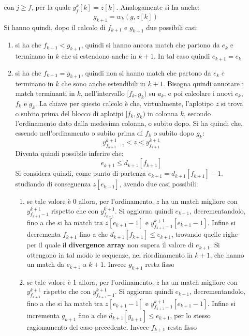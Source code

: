 con $j\geq f$, per la quale $y_j^k[k]=z[k]$. Analogamente si ha anche:
\[g_{k+1}=w_k(g,z[k])\]
Si hanno quindi, dopo il calcolo di $f_{k+1}$ e $g_{k+1}$ due possibili casi:
\begin{enumerate}
  \item si ha che $f_{k+1}<g_{k+1}$, quindi si hanno ancora match che partono da
  $e_k$ e terminano in $k$ che si estendono anche in $k+1$. In tal caso quindi
  $e_{k+1}=e_k$
  \item si ha che $f_{k+1}=g_{k+1}$, quindi non si hanno match che partono da
  $e_k$ e terminano in $k$ che sono anche estendibili in $k+1$. Bisogna quindi
  annotare i match terminanti in $k$, nell'intervallo $[f_k,g_k)$ su $a_k$,
  e poi calcolare i nuovi $e_k$, $f_k$ e $g_k$. La chiave per questo calcolo è
  che, virtualmente, l'aplotipo $z$ si trova o  subito prima del blocco di
  aplotipi $[f_k,g_k)$ in colonna $k$, secondo l'ordinamento dato dalla medesima
  colonna, o subito dopo. Si ha quindi che, essendo nell'ordinamento o subito
  prima di $f_{k}$ o subito dopo $g_k$:
  \[y_{f_{k+1}-1}^{k+1}<z<y_{f_{k+1}}^{k+1}\]
  Diventa quindi possibile inferire che:
  \[e_{k+1}\leq d_{k+1}[f_{k+1}]\]
  Si considera quindi, come punto di partenza $e_{k+1}=d_{k+1}[f_{k+1}]-1$,
  studiando di conseguenza $z[e_{k+1}]$, avendo due casi possibili:
  \begin{enumerate}
    \item se tale valore è 0 allora, per l'ordinamento, $z$ ha un match migliore
    con $y_{f_{k+1}-1}^{k+1}$ rispetto che con $y_{f_{k+1}}^{k+1}$. Si aggiorna
    quindi $e_{k+1}$, decrementandolo, fino a che si ha match tra $z[e_{k+1}-1]$
    e $y_{f_{k+1}-1}^{k+1}[e_{k+1}-1]$. Infine si decrementa $f_{k+1}$ fino a
    che $d_{k+1}[f_{k+1}]\leq e_{k+1}$, trovando quelle righe per il quale il
    \textbf{divergence array} non supera il valore di $e_{k+1}$. Si ottengono in
    tal modo le sequenze, nel riordinamento in $k+1$, che hanno un match da
    $e_{k+1}$ a $k+1$. Invece $g_{k+1}$ resta fisso
    \item se tale valore è 1 allora, per l'ordinamento, $z$ ha un match migliore
    con $y_{f_{k+1}}^{k+1}$ rispetto che con $y_{f_{k+1}-1}^{k+1}$. Si aggiorna
    quindi $e_{k+1}$, decrementandolo, fino a che si ha match tra $z[e_{k+1}-1]$
    e $y_{f_{k+1}-1}^{k+1}[e_{k+1}-1]$. Infine si incrementa $g_{k+1}$ fino a
    che $d_{k+1}[g_{k+1}]\leq e_{k+1}$, per lo stesso ragionamento del caso
    precedente. Invece $f_{k+1}$ resta fisso 
  \end{enumerate}
\end{enumerate}
